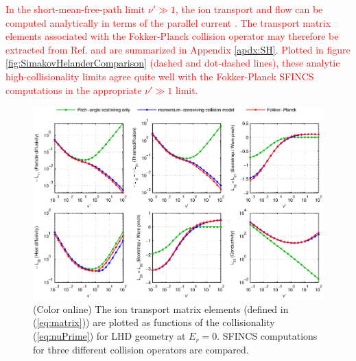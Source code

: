 \documentclass[12pt,superscriptaddress]{revtex4}
\newcommand{\changed}[1]{\textcolor{red}{#1}}
\begin{document}
\changed{
In the short-mean-free-path limit $\nu' \gg 1$, the ion transport and flow can be computed
analytically in terms of the parallel current \cite{AndreiPer2009}.
The transport matrix elements associated with the Fokker-Planck collision operator
may therefore be extracted from Ref. \cite{AndreiPer2009} and are summarized in Appendix \ref{apdx:SH}.
Plotted in figure \ref{fig:SimakovHelanderComparison} (dashed and dot-dashed lines),
these analytic high-collisionality limits agree quite well with the Fokker-Planck SFINCS computations
in the appropriate $\nu' \gg 1$ limit.
}

\begin{figure}[h!]
\includegraphics{m20140205_01_plotSFINCSFortranAndMatlabNuScansForPaper_LHD.eps}
\caption{(Color online) 
The ion transport matrix elements (defined in (\ref{eq:matrix})) are plotted as functions
of the collisionality (\ref{eq:nuPrime}) for LHD geometry at $E_r=0$.
SFINCS computations for three different collision operators are compared.
\label{fig:collisionComparison_LHD}}
\end{figure}
\end{document}
